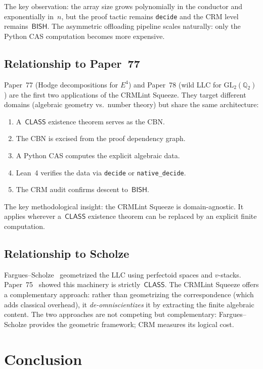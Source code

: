 \documentclass[11pt]{article}
\theoremstyle{plain}
\theoremstyle{definition}
\theoremstyle{remark}
\newcommand{\Q}{\mathbb{Q}}
\newcommand{\GL}{\mathrm{GL}}
\newcommand{\BISH}{\mathsf{BISH}}
\newcommand{\CLASS}{\mathsf{CLASS}}
\begin{document}
The key observation: the array size grows polynomially in the
conductor and exponentially in~$n$, but the proof tactic
remains \texttt{decide} and the CRM level remains~$\BISH$.
The asymmetric offloading pipeline scales naturally: only the
Python CAS computation becomes more expensive.

\subsection{Relationship to Paper~77}

Paper~77 (Hodge decompositions for $E^4$) and Paper~78 (wild
LLC for $\GL_2(\Q_2)$) are the first two applications of the
CRMLint Squeeze.  They target different domains (algebraic
geometry vs.\ number theory) but share the same architecture:

\begin{enumerate}[nosep]
\item A~$\CLASS$ existence theorem serves as the CBN.
\item The CBN is excised from the proof dependency graph.
\item A Python CAS computes the explicit algebraic data.
\item Lean~4 verifies the data via \texttt{decide} or
  \texttt{native\_decide}.
\item The CRM audit confirms descent to~$\BISH$.
\end{enumerate}

The key methodological insight: the CRMLint Squeeze is
domain-agnostic.  It applies wherever a~$\CLASS$ existence
theorem can be replaced by an explicit finite computation.

\subsection{Relationship to Scholze}

Fargues--Scholze~\cite{FarguesScholze2024} geometrized the LLC
using perfectoid spaces and $v$-stacks.  Paper~75~\cite{Paper75}
showed this machinery is strictly~$\CLASS$.  The CRMLint Squeeze
offers a complementary approach: rather than geometrizing the
correspondence (which adds classical overhead), it
\emph{de-omniscientizes} it by extracting the finite algebraic
content.  The two approaches are not competing but
complementary: Fargues--Scholze provides the geometric framework;
CRM measures its logical cost.

\section{Conclusion}\label{sec:conclusion}
\end{document}
